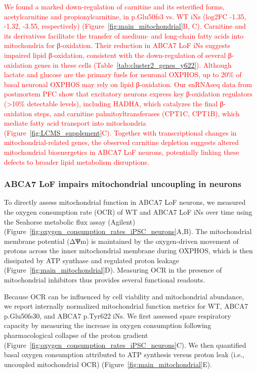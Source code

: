 \textcolor{red}{We found a marked down-regulation of carnitine and its esterified forms, acetylcarnitine and propionylcarnitine, in p.Glu50fs3 vs. WT iNs (log2FC -1.35, -1.32, -3.55, respectively) (Figure~\ref{fig:main_mitochondrial}B, C). Carnitine and its derivatives facilitate the transfer of medium- and long-chain fatty acids into mitochondria for β-oxidation\cite{noauthor_2016-la,noauthor_2004-tm}. Their reduction in ABCA7 LoF iNs suggests impaired lipid β-oxidation, consistent with the down-regulation of several β-oxidation genes in these cells (Table~\ref{tab:cluster2_genes_y622}). Although lactate and glucose are the primary fuels for neuronal OXPHOS\cite{Dienel2018-dt,Trigo2022-ym,Yellen2018-kr}, up to 20\% of basal neuronal OXPHOS may rely on lipid β-oxidation\cite{Morant-Ferrando2023-va}. Our snRNAseq data from postmortem PFC show that excitatory neurons express key β-oxidation regulators (>10\% detectable levels), including HADHA, which catalyzes the final β-oxidation steps, and carnitine palmitoyltransferases (CPT1C, CPT1B), which mediate fatty acid transport into mitochondria (Figure~\ref{fig:LCMS_supplement}C). Together with transcriptional changes in mitochondrial-related genes, the observed carnitine depletion suggests altered mitochondrial bioenergetics in ABCA7 LoF neurons, potentially linking these defects to broader lipid metabolism disruptions.}

\subsubsection{ABCA7 LoF impairs mitochondrial uncoupling in neurons}
To directly assess mitochondrial function in ABCA7 LoF neurons, we measured the oxygen consumption rate (OCR) of WT and ABCA7 LoF iNs over time using the Seahorse metabolic flux assay (Agilent) (Figure~\ref{fig:oxygen_consumption_rates_iPSC_neurons}A,B). The mitochondrial membrane potential (ΔѰm) is maintained by the oxygen-driven movement of protons across the inner mitochondrial membrane during OXPHOS, which is then dissipated by ATP synthase and regulated proton leakage (Figure~\ref{fig:main_mitochondrial}D). Measuring OCR in the presence of mitochondrial inhibitors thus provides several functional readouts.

Because OCR can be influenced by cell viability and mitochondrial abundance\cite{Divakaruni2014-eq,Gu2021-ms}, we report internally normalized mitochondrial function metrics\cite{Divakaruni2022-rj} for WT, ABCA7 p.Glu50fs30, and ABCA7 p.Tyr622 iNs. We first assessed spare respiratory capacity by measuring the increase in oxygen consumption following pharmacological collapse of the proton gradient\cite{Divakaruni2022-rj} (Figure~\ref{fig:oxygen_consumption_rates_iPSC_neurons}C). We then quantified basal oxygen consumption attributed to ATP synthesis versus proton leak (i.e., uncoupled mitochondrial OCR)\cite{Divakaruni2014-eq} (Figure~\ref{fig:main_mitochondrial}E).

